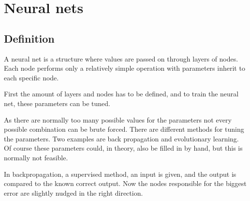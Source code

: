 \section{Neural nets} 
\label{sec:NN}
\subsection{Definition} \cite[p727]{MA}
A neural net is a structure where values are passed on through layers of nodes. Each node performs only a relatively simple operation with parameters inherit to each specific node.

First the amount of layers and nodes has to be defined, and to train the neural net, these parameters can be tuned.

As there are normally too many possible values for the parameters not every possible combination can be brute forced. There are different methods for tuning the parameters. Two examples are back propagation and evolutionary learning. Of course these parameters could, in theory, also be filled in by hand, but this is normally not feasible.

In backpropagation, a supervised method, an input is given, and the output is compared to the known correct output. Now the nodes responsible for the biggest error are slightly nudged in the right direction.